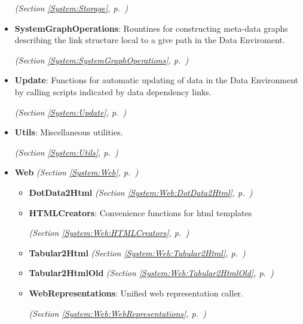 \begin{itemize}
  \textit{(Section \ref{System:Storage}, p.~\pageref{System:Storage})}

\item \textbf{SystemGraphOperations}: Rountines for constructing meta-data graphs describing the link structure 
local to a give path in the Data Enviroment.



  \textit{(Section \ref{System:SystemGraphOperations}, p.~\pageref{System:SystemGraphOperations})}

\item \textbf{Update}: 
Functions for automatic updating of data in the Data Environment by calling 
scripts indicated by data dependency links. 


  \textit{(Section \ref{System:Update}, p.~\pageref{System:Update})}

\item \textbf{Utils}: Miscellaneous utilities.



  \textit{(Section \ref{System:Utils}, p.~\pageref{System:Utils})}

\item \textbf{Web}
  \textit{(Section \ref{System:Web}, p.~\pageref{System:Web})}

  \begin{itemize}
\setlength{\parskip}{0ex}
    \item \textbf{DotData2Html}
  \textit{(Section \ref{System:Web:DotData2Html}, p.~\pageref{System:Web:DotData2Html})}

    \item \textbf{HTMLCreators}: Convenience functions for html templates



  \textit{(Section \ref{System:Web:HTMLCreators}, p.~\pageref{System:Web:HTMLCreators})}

    \item \textbf{Tabular2Html}
  \textit{(Section \ref{System:Web:Tabular2Html}, p.~\pageref{System:Web:Tabular2Html})}

    \item \textbf{Tabular2HtmlOld}
  \textit{(Section \ref{System:Web:Tabular2HtmlOld}, p.~\pageref{System:Web:Tabular2HtmlOld})}

    \item \textbf{WebRepresentations}: Unified web representation caller.



  \textit{(Section \ref{System:Web:WebRepresentations}, p.~\pageref{System:Web:WebRepresentations})}


\end{itemize}
\end{itemize}
